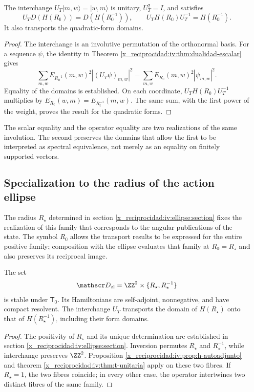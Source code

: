 \begin{theorem}
\label{x_reciprocidad:iv:thm:t-unitaria}
\label{x_reciprocidad:prop:dualidad-radios-k}
The interchange
\(U_T|m,w\rangle=|w,m\rangle\) is unitary,
\(U_T^2=I\), and satisfies
\begin{equation}
 U_TD(H(R_0))=D(H(R_0^{-1})),
 \qquad U_TH(R_0)U_T^{-1}=H(R_0^{-1}).
 \label{x_reciprocidad:iv:eq:conjugacion-h}
\end{equation}
It also transports the quadratic-form domains.
\end{theorem}
\begin{proof}
The interchange is an involutive permutation of the
orthonormal basis. For a sequence \(\psi\), the identity in
Theorem \ref{x_reciprocidad:iv:thm:dualidad-escalar} gives
\[
 \sum_{m,w}E_{R_0^{-1}}(m,w)^2|(U_T\psi)_{m,w}|^2
 =\sum_{m,w}E_{R_0}(m,w)^2|\psi_{m,w}|^2.
\]
Equality of the domains is established. On each coordinate,
\(U_TH(R_0)U_T^{-1}\) multiplies by
\(E_{R_0}(w,m)=E_{R_0^{-1}}(m,w)\). The same sum, with
the first power of the weight, proves the result for the
quadratic forms.
\end{proof}

The scalar equality and the operator equality are two realizations
of the same involution. The second preserves the domains that
allow the first to be interpreted as spectral equivalence,
not merely as an equality on finitely supported vectors.

\subsection{Specialization to the radius of the action ellipse}

The radius \(R_\star\) determined in section
\ref{x_reciprocidad:iv:ellipse:section} fixes the realization of this family that
corresponds to the angular publications of the state. The symbol
\(R_0\) allows the transport results to be expressed for the entire
positive family; composition with the ellipse evaluates that family at
\(R_0=R_\star\) and also preserves its reciprocal image.

\begin{corollary}
\label{x_reciprocidad:iv:cor:radio-especializado}
The set
\[
 \mathscr D_{\mathrm{el}}
 =\ZZ^2\times\{R_\star,R_\star^{-1}\}
\]
is stable under \(\mathsf T_0\). Its Hamiltonians are self-adjoint,
nonnegative, and have compact resolvent. The interchange \(U_T\)
transports the domain of \(H(R_\star)\) onto that of
\(H(R_\star^{-1})\), including their form domains.
\end{corollary}
\begin{proof}
The positivity of \(R_\star\) and its unique determination are established
in section \ref{x_reciprocidad:iv:ellipse:section}. Inversion permutes
\(R_\star\) and \(R_\star^{-1}\), while interchange preserves
\(\ZZ^2\). Proposition
\ref{x_reciprocidad:iv:prop:h-autoadjunto} and theorem \ref{x_reciprocidad:iv:thm:t-unitaria} apply on these two fibres.
If \(R_\star=1\), the two fibres coincide; in every other case,
the operator intertwines two distinct fibres of the same family.
\end{proof}


